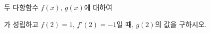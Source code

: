 두 다항함수 $f(x)$, $g(x)$에 대하여\par\smallskip{}\par\smallskip\noindent 가 성립하고 $f(2)=1$, $f'(2)=-1$일 때, $g(2)$의 값을 구하시오. 
